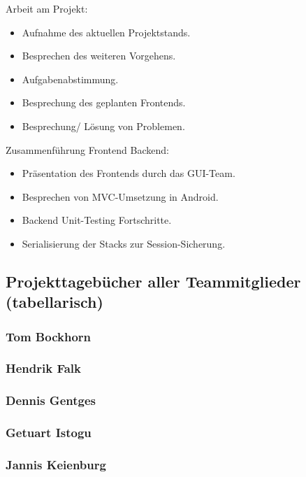 Arbeit am Projekt:

\begin{itemize}
	\item Aufnahme des aktuellen Projektstands.
	\item Besprechen des weiteren Vorgehens.
	\item Aufgabenabstimmung.
	\item Besprechung des geplanten Frontends.
	\item Besprechung/ Lösung von Problemen.
\end{itemize}


Zusammenführung Frontend Backend:

\begin{itemize}
	\item Präsentation des Frontends durch das GUI-Team.
	\item Besprechen von MVC-Umsetzung in Android.
	\item Backend Unit-Testing Fortschritte.
	\item Serialisierung der Stacks zur Session-Sicherung.
\end{itemize}

\subsection{Projekttagebücher aller Teammitglieder (tabellarisch)}

\subsubsection{Tom Bockhorn}

\subsubsection{Hendrik Falk}

\subsubsection{Dennis Gentges}

\subsubsection{Getuart Istogu}

\subsubsection{Jannis Keienburg}

